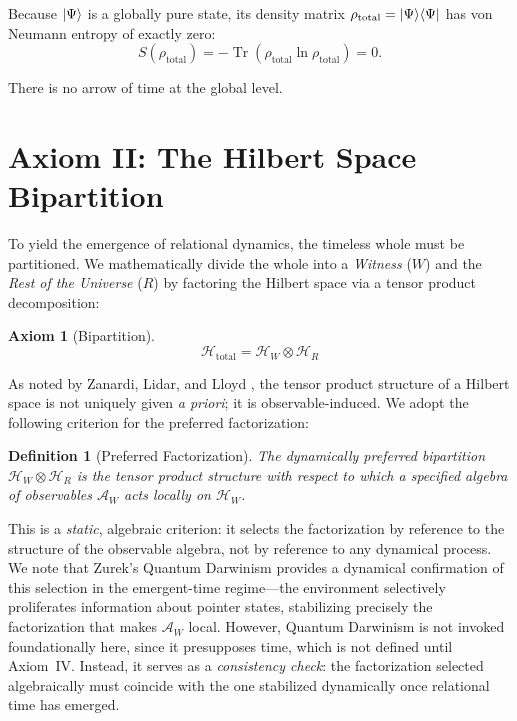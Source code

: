 \documentclass[12pt, a4paper]{article}
\newtheorem{axiom}{Axiom}
\newtheorem{definition}{Definition}
\begin{document}
\noindent Because $\ket{\Psi}$ is a globally pure state, its density matrix $\rho_{\mathrm{total}} = \ket{\Psi}\!\bra{\Psi}$ has von Neumann entropy of exactly zero:
\begin{equation}
S(\rho_{\mathrm{total}}) = -\operatorname{Tr}(\rho_{\mathrm{total}} \ln \rho_{\mathrm{total}}) = 0.
\label{eq:Stotal}
\end{equation}

There is no arrow of time at the global level.

\section{Axiom II: The Hilbert Space Bipartition}
\label{sec:axiom2}

To yield the emergence of relational dynamics, the timeless whole must be partitioned. We mathematically divide the whole into a \emph{Witness} ($W$) and the \emph{Rest of the Universe} ($R$) by factoring the Hilbert space via a tensor product decomposition:

\begin{axiom}[Bipartition]
\begin{equation}
\mathcal{H}_{\mathrm{total}} = \mathcal{H}_W \otimes \mathcal{H}_R
\label{eq:bipartition}
\end{equation}
\end{axiom}

As noted by Zanardi, Lidar, and Lloyd \cite{Zanardi2004}, the tensor product structure of a Hilbert space is not uniquely given \emph{a priori}; it is observable-induced. We adopt the following criterion for the preferred factorization:

\begin{definition}[Preferred Factorization]
The dynamically preferred bipartition $\mathcal{H}_W \otimes \mathcal{H}_R$ is the tensor product structure with respect to which a specified algebra of observables $\mathcal{A}_W$ acts locally on $\mathcal{H}_W$.
\end{definition}

This is a \emph{static}, algebraic criterion: it selects the factorization by reference to the structure of the observable algebra, not by reference to any dynamical process. We note that Zurek's Quantum Darwinism \cite{Zurek2009} provides a dynamical confirmation of this selection in the emergent-time regime---the environment selectively proliferates information about pointer states, stabilizing precisely the factorization that makes $\mathcal{A}_W$ local. However, Quantum Darwinism is not invoked foundationally here, since it presupposes time, which is not defined until Axiom~IV. Instead, it serves as a \emph{consistency check}: the factorization selected algebraically must coincide with the one stabilized dynamically once relational time has emerged.
\end{document}
